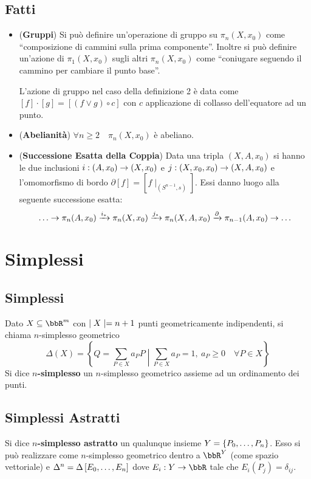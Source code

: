 \documentclass[a4paper,NoNotes,GeneralMath]{stdmdoc}
\let\xrar\xrightarrow
\begin{document}
\subsection*{Fatti}
\begin{itemize}
\item ({\bf Gruppi}) Si può definire un'operazione di gruppo su $\pi_n (X, x_0)$ come ``composizione di cammini sulla prima componente''.
  Inoltre si può definire un'azione di $\pi_1 (X, x_0)$ sugli altri $\pi_n (X, x_0)$ come ``coniugare seguendo il cammino per cambiare il punto base''.

  L'azione di gruppo nel caso della definizione 2 è data come $[f] \cdot [g] = [ (f \vee g) \circ c ]$ con $c$ applicazione di collasso dell'equatore ad un punto.
\item ({\bf Abelianità}) $\forall n \ge 2 \quad \pi_n (X, x_0)$ è abeliano.
\item ({\bf Successione Esatta della Coppia}) Data una tripla $(X, A, x_0)$ si hanno le due inclusioni $i: (A, x_0) \rightarrow (X, x_0)$ e $j: (X, x_0, x_0) \rightarrow (X, A, x_0)$ e l'omomorfismo di bordo $\partial [f] = [f\mid_{(S^{n-1}, s)}]$. Essi danno luogo alla seguente successione esatta:
  $$ \ldots \rar \pi_n(A, x_0) \xrar{i_*} \pi_n(X, x_0) \xrar{j_*} \pi_n(X, A, x_0) \xrar{\partial} \pi_{n-1}(A, x_0) \rar \ldots $$
\end{itemize}

\section*{Simplessi}
\subsection*{Simplessi}
Dato $X \subseteq \bbR^m$ con $\mid X \mid = n+1$ punti geometricamente indipendenti, si chiama $n$-simplesso geometrico
$$ \Delta(X) = \left\{ Q = \sum_{P \in X} a_P P \middle| \sum_{P \in X} a_P = 1, \ a_P \ge 0 \quad \forall P \in X \right\} $$
Si dice {\bf $n$-simplesso} un $n$-simplesso geometrico assieme ad un ordinamento dei punti.

\subsection*{Simplessi Astratti}
Si dice {\bf $n$-simplesso astratto} un qualunque insieme $Y = \left\{{P_0, \ldots, P_n}\right\}$.
Esso si può realizzare come $n$-simplesso geometrico dentro a $\bbR^Y$ (come spazio vettoriale) e $\Delta^n = \Delta\left[{E_0, \ldots, E_n}\right]$ dove $E_i: Y \rar \bbR$ tale che $E_i(P_j) = \delta_{ij}$.
\end{document}

